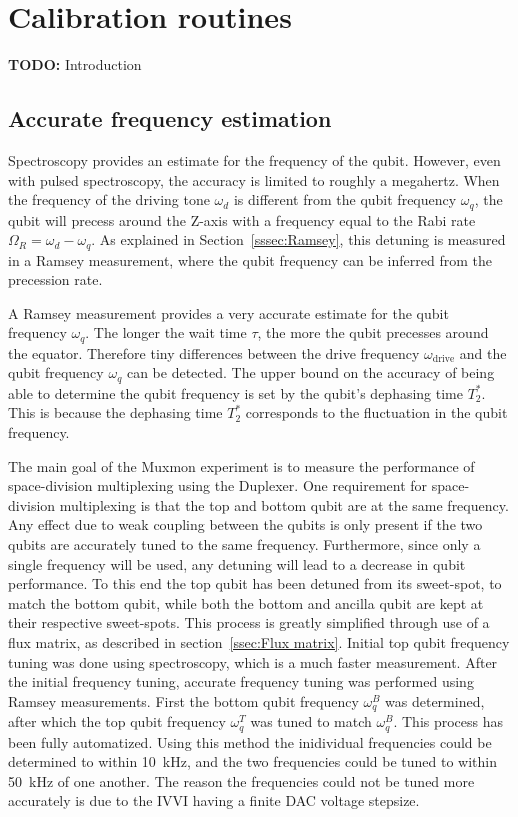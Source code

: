   \chapter{Calibration routines}
    \textbf{TODO:} Introduction
    \section{Accurate frequency estimation}
      Spectroscopy provides an estimate for the frequency of the qubit. However, even with pulsed spectroscopy, the accuracy is limited to roughly a megahertz. When the frequency of the driving tone $\omega_d$ is different from the qubit frequency $\omega_q$, the qubit will precess around the Z-axis with a frequency equal to the Rabi rate $\Omega_R = \omega_d - \omega_q$. As explained in Section~\ref{sssec:Ramsey}, this detuning is measured in a Ramsey measurement, where the qubit frequency can be inferred from the precession rate.

      A Ramsey measurement provides a very accurate estimate for the qubit frequency $\omega_q$. The longer the wait time $\tau$, the more the qubit precesses around the equator. Therefore tiny differences between the drive frequency $\omega_\text{drive}$ and the qubit frequency $\omega_q$ can be detected. The upper bound on the accuracy of being able to determine the qubit frequency is set by the qubit's dephasing time $T_2^*$. This is because the dephasing time $T_2^*$ corresponds to the fluctuation in the qubit frequency.

      The main goal of the Muxmon experiment is to measure the performance of space-division multiplexing using the Duplexer. One requirement for space-division multiplexing is that the top and bottom qubit are at the same frequency. Any effect due to weak coupling between the qubits is only present if the two qubits are accurately tuned to the same frequency. Furthermore, since only a single frequency will be used, any detuning will lead to a decrease in qubit performance. To this end the top qubit has been detuned from its sweet-spot, to match the bottom qubit, while both the bottom and ancilla qubit are kept at their respective sweet-spots. This process is greatly simplified through use of a flux matrix, as described in section~\ref{ssec:Flux matrix}. Initial top qubit frequency tuning was done using spectroscopy, which is a much faster measurement. After the initial frequency tuning, accurate frequency tuning was performed using Ramsey measurements. First the bottom qubit frequency $\omega_q^B$ was determined, after which the top qubit frequency $\omega_q^T$  was tuned to match $\omega_q^B$. This process has been fully automatized. Using this method the inidividual frequencies could be determined to within \SI{10}{\kilo \hertz}, and the two frequencies could be tuned to within \SI{50}{\kilo \hertz} of one another. The reason the frequencies could not be tuned more accurately is due to the IVVI having a finite DAC voltage stepsize.

